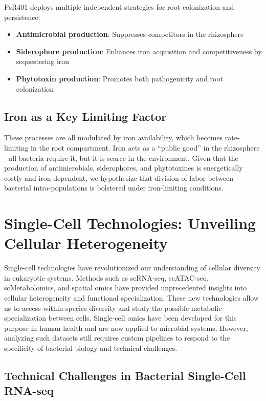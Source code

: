 \documentclass[
  11pt,
  a4paper,
]{report}
\providecommand{\tightlist}{%
  \setlength{\itemsep}{0pt}\setlength{\parskip}{0pt}}\usepackage{longtable,booktabs,array}
\begin{document}
PsR401 deploys multiple independent strategies for root colonization and
persistence:

\begin{itemize}
\tightlist
\item
  \textbf{Antimicrobial production}: Suppresses competitors in the
  rhizosphere
\item
  \textbf{Siderophore production}: Enhances iron acquisition and
  competitiveness by sequestering iron
\item
  \textbf{Phytotoxin production}: Promotes both pathogenicity and root
  colonization
\end{itemize}

\subsection{Iron as a Key Limiting
Factor}\label{iron-as-a-key-limiting-factor}

These processes are all modulated by iron availability, which becomes
rate-limiting in the root compartment. Iron acts as a ``public good'' in
the rhizosphere - all bacteria require it, but it is scarce in the
environment. Given that the production of antimicrobials, siderophores,
and phytotoxines is energetically costly and iron-dependent, we
hypothesize that division of labor between bacterial intra-populations
is bolstered under iron-limiting conditions.

\section{Single-Cell Technologies: Unveiling Cellular
Heterogeneity}\label{single-cell-technologies-unveiling-cellular-heterogeneity}

Single-cell technologies have revolutionized our understanding of
cellular diversity in eukaryotic systems. Methods such as scRNA-seq,
scATAC-seq, scMetabolomics, and spatial omics have provided
unprecedented insights into cellular heterogeneity and functional
specialization. These new technologies allow us to access within-species
diversity and study the possible metabolic specialization between cells.
Single-cell omics have been developed for this purpose in human health
and are now applied to microbial systems. However, analyzing such
datasets still requires custom pipelines to respond to the specificity
of bacterial biology and technical challenges.

\subsection{Technical Challenges in Bacterial Single-Cell
RNA-seq}\label{technical-challenges-in-bacterial-single-cell-rna-seq}
\end{document}
